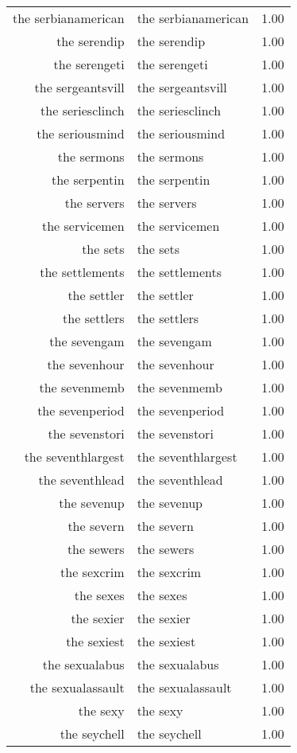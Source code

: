 \begin{table}[ht]
\begin{tabular}{rlr}
  the serbianamerican & the serbianamerican & 1.00 \\ 
  the serendip & the serendip & 1.00 \\ 
  the serengeti & the serengeti & 1.00 \\ 
  the sergeantsvill & the sergeantsvill & 1.00 \\ 
  the seriesclinch & the seriesclinch & 1.00 \\ 
  the seriousmind & the seriousmind & 1.00 \\ 
  the sermons & the sermons & 1.00 \\ 
  the serpentin & the serpentin & 1.00 \\ 
  the servers & the servers & 1.00 \\ 
  the servicemen & the servicemen & 1.00 \\ 
  the sets & the sets & 1.00 \\ 
  the settlements & the settlements & 1.00 \\ 
  the settler & the settler & 1.00 \\ 
  the settlers & the settlers & 1.00 \\ 
  the sevengam & the sevengam & 1.00 \\ 
  the sevenhour & the sevenhour & 1.00 \\ 
  the sevenmemb & the sevenmemb & 1.00 \\ 
  the sevenperiod & the sevenperiod & 1.00 \\ 
  the sevenstori & the sevenstori & 1.00 \\ 
  the seventhlargest & the seventhlargest & 1.00 \\ 
  the seventhlead & the seventhlead & 1.00 \\ 
  the sevenup & the sevenup & 1.00 \\ 
  the severn & the severn & 1.00 \\ 
  the sewers & the sewers & 1.00 \\ 
  the sexcrim & the sexcrim & 1.00 \\ 
  the sexes & the sexes & 1.00 \\ 
  the sexier & the sexier & 1.00 \\ 
  the sexiest & the sexiest & 1.00 \\ 
  the sexualabus & the sexualabus & 1.00 \\ 
  the sexualassault & the sexualassault & 1.00 \\ 
  the sexy & the sexy & 1.00 \\ 
  the seychell & the seychell & 1.00 \\ 

\end{tabular}
\end{table}
